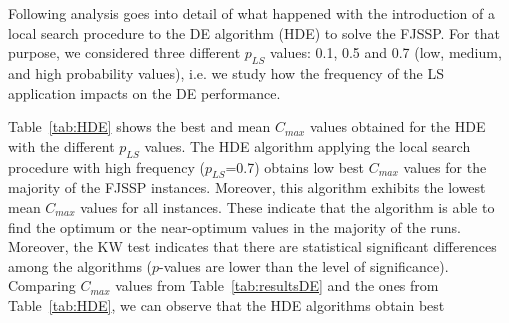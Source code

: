 


Following analysis goes into detail of what happened with the introduction of a local search procedure to the DE algorithm (HDE) to solve the FJSSP. For that purpose, we considered three different $p_{LS}$ values: 0.1, 0.5 and 0.7 (low, medium, and high probability values), i.e. we study how the frequency of the LS application impacts on the DE performance.

Table~\ref{tab:HDE} shows the best and mean $C_{max}$ values obtained for the HDE with the different $p_{LS}$ values. The HDE algorithm applying the local search procedure with high frequency ($p_{LS}$=0.7) obtains low best $C_{max}$ values for the majority of the FJSSP instances. Moreover, this algorithm exhibits the lowest mean $C_{max}$ values for all instances. These indicate that the algorithm is able to find the optimum or the near-optimum values in the majority of the runs.  Moreover, the KW test indicates that there are statistical significant differences among the algorithms ($p$-values are lower than the level of significance). Comparing  $C_{max}$ values from Table~\ref{tab:resultsDE} and the ones from Table~\ref{tab:HDE}, we can observe that the HDE algorithms obtain best 

